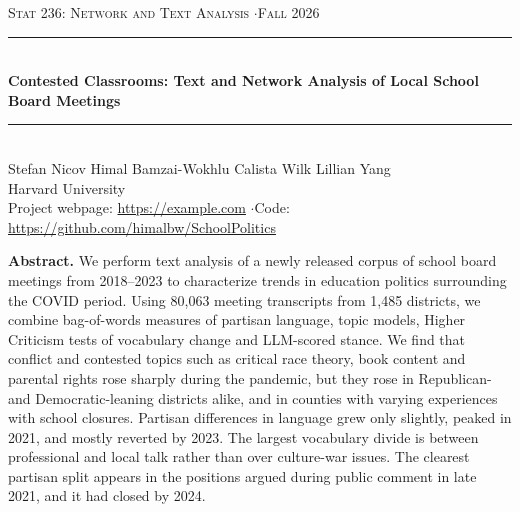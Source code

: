 \documentclass[12pt]{article}
\begin{document}
\thispagestyle{plain}
\begin{center}
  {\small\textsc{Stat 236: Network and Text Analysis \quad$\cdot$\quad Fall 2026}}\\[0.6em]
  \rule{\textwidth}{0.8pt}\\[0.5em]
  {\bfseries Contested Classrooms: Text and Network Analysis of Local School Board Meetings}\\[0.6em]
  \rule{\textwidth}{0.4pt}\\[0.8em]
  {\large Stefan Nicov \quad Himal Bamzai-Wokhlu \quad Calista Wilk \quad Lillian Yang}\\[0.3em]
  {\small Harvard University}\\[0.3em]
  {\small Project webpage: \url{https://example.com} \quad$\cdot$\quad Code: \url{https://github.com/himalbw/SchoolPolitics}}
\end{center}

\begin{center}
\begin{minipage}{0.9\textwidth}
\small
\noindent\textbf{Abstract.} We perform text analysis of a
newly released corpus of school board meetings from 2018--2023 to characterize
trends in education politics surrounding the COVID period. Using 80,063 meeting
transcripts from 1,485 districts, we combine bag-of-words measures of partisan
language, topic models, Higher Criticism tests of vocabulary change and
LLM-scored stance. We find that conflict and contested topics such as critical
race theory, book content and parental rights rose sharply during the pandemic,
but they rose in Republican- and Democratic-leaning districts alike, and in counties with varying experiences with school closures.  Partisan
differences in language grew only slightly, peaked in 2021, and mostly reverted
by 2023. The largest vocabulary divide is between professional and local talk
rather than over culture-war issues. The clearest partisan split appears in the
positions argued during public comment in late 2021, and it had closed by 2024.

\vspace{20em}
\end{minipage}
\end{center}
\vspace{0.3em}

\newpage

\tableofcontents

\newpage 

\end{document}
